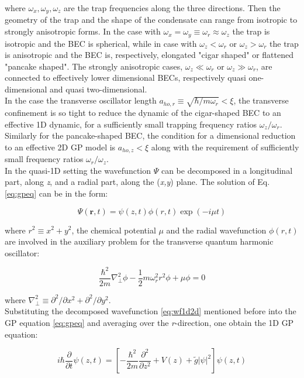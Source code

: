 \documentclass[../main.tex]{subfiles}
\begin{document}
where $\omega_x, \omega_y, \omega_z$ are the trap frequencies along the three directions. Then the geometry of the trap and the shape of the condensate can range from isotropic to strongly anisotropic forms. In the case with $\omega_x = \omega_y \equiv \omega_r \approx \omega_z$ the trap is isotropic and the BEC is spherical, while in case with $\omega_z < \omega_r$ or $\omega_z > \omega_r$ the trap is anisotropic and the BEC is, respectively, elongated "cigar shaped" or flattened "pancake shaped". The strongly anisotropic cases, $\omega_z \ll \omega_r$ or $\omega_z \gg \omega_r$, are connected to effectively lower dimensional BECs, respectively quasi one-dimensional and quasi two-dimensional.\\
In the case the transverse oscillator length $a_{ho,r} \equiv \sqrt{\hbar / m \omega_r} < \xi$, the transverse confinement is so tight to reduce the dynamic of the cigar-shaped BEC to an effective 1D dynamic, for a sufficiently small trapping frequency ratios $\omega_z / \omega_r$. Similarly for the pancake-shaped BEC, the condition for a dimensional reduction to an effective 2D GP model is $a_{ho,z} < \xi$ along with the requirement of  sufficiently small frequency ratios $\omega_r / \omega_z$.\\
In the quasi-1D setting the wavefunction $\Psi$ can be decomposed in a longitudinal part, along \textit{z}, and a radial part, along the (\textit{x,y}) plane. The solution of Eq.\ref{eq:gpeq} can be in the form:

\begin{equation}
\Psi(\textbf{r}, t) = \psi(z,t) \phi(r,t) \exp(-i\mu t)
\label{eq:wf1d2d}
\end{equation}

where $r^2 \equiv x^2 + y^2$, the chemical potential $\mu$ and the radial wavefunction $\phi(r,t)$ are involved in the auxiliary problem for the transverse quantum harmonic oscillator:

\begin{equation}
\frac{\hbar^2}{2m} \nabla^2_\perp \phi - \frac{1}{2} m \omega_r^2 r^2 \phi + \mu \phi = 0
\end{equation}

where $\nabla^2_\perp \equiv \partial^2 / \partial x^2 +  \partial^2 / \partial y^2$.\\
Substituting the decomposed wavefunction \ref{eq:wf1d2d} mentioned before into the GP equation \ref{eq:gpeq} and averaging over the \textit{r}-direction, one obtain the 1D GP equation:

\begin{equation}
i\hbar \frac{\partial}{\partial t} \psi(z,t) = \left[ -\frac{\hbar^2}{2m} \frac{\partial^2}{\partial z^2} + V(z) + \tilde{g} |\psi|^2 \right] \psi(z,t)
\end{equation}
\end{document}
